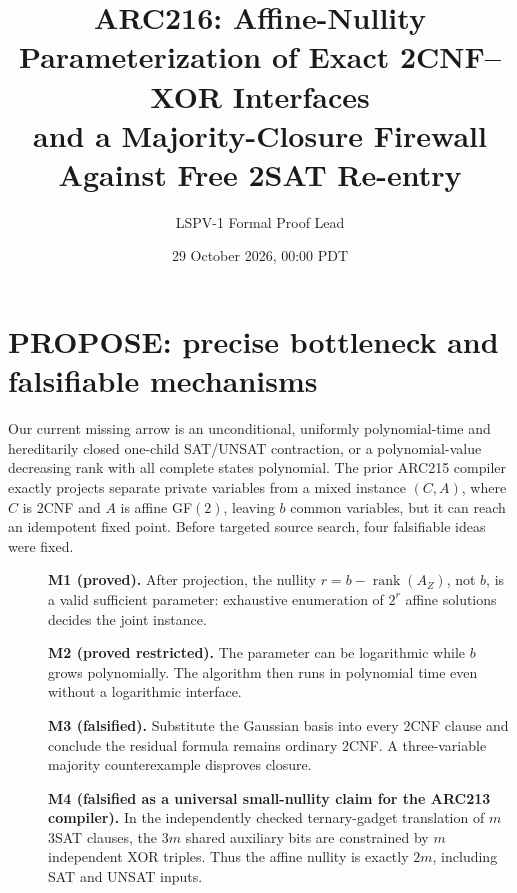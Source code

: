 \documentclass[11pt]{article}
\title{ARC216: Affine-Nullity Parameterization of Exact 2CNF--XOR Interfaces\\and a Majority-Closure Firewall Against Free 2SAT Re-entry}
\author{LSPV-1 Formal Proof Lead}
\date{29 October 2026, 00:00 PDT}
\begin{document}
\maketitle
\begin{center}\end{center}

\section{PROPOSE: precise bottleneck and falsifiable mechanisms}
Our current missing arrow is an unconditional, uniformly polynomial-time and hereditarily closed one-child SAT/UNSAT contraction, or a polynomial-value decreasing rank with all complete states polynomial. The prior ARC215 compiler exactly projects separate private variables from a mixed instance $(C,A)$, where $C$ is 2CNF and $A$ is affine GF$(2)$, leaving $b$ common variables, but it can reach an idempotent fixed point. Before targeted source search, four falsifiable ideas were fixed.

\begin{description}
\item[]\textbf{M1 (proved).} After projection, the nullity $r=b-\operatorname{rank}(A_Z)$, not $b$, is a valid sufficient parameter: exhaustive enumeration of $2^r$ affine solutions decides the joint instance.

\item[]\textbf{M2 (proved restricted).} The parameter can be logarithmic while $b$ grows polynomially. The algorithm then runs in polynomial time even without a logarithmic interface.

\item[]\textbf{M3 (falsified).} Substitute the Gaussian basis into every 2CNF clause and conclude the residual formula remains ordinary 2CNF. A three-variable majority counterexample disproves closure.

\item[]\textbf{M4 (falsified as a universal small-nullity claim for the ARC213 compiler).} In the independently checked ternary-gadget translation of $m$ 3SAT clauses, the $3m$ shared auxiliary bits are constrained by $m$ independent XOR triples. Thus the affine nullity is exactly $2m$, including SAT and UNSAT inputs.

\end{description}
\end{document}
